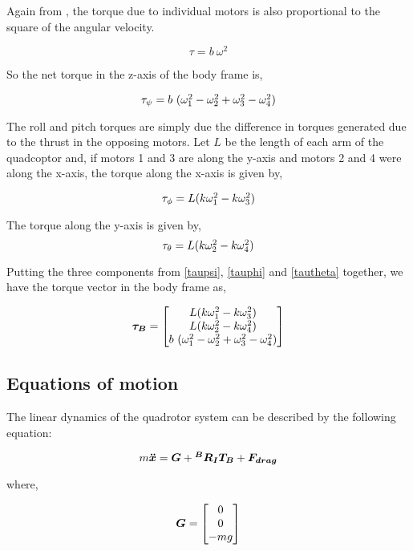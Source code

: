 \documentclass[12pt,fleqn]{article}
\newcommand{\mbm}[1]{\mbox{\boldmath $#1$}}
\begin{document}
Again from \cite{Andrew}, the torque due to individual motors is also
proportional to the square of the angular velocity.

$$ \tau = b\ \omega^2 $$

So the net torque in the z-axis of the body frame is,

\begin{equation} \label{taupsi}
$$ \tau_\psi = b\ (\omega_1^2 - \omega_2^2 + \omega_3^2 -
\omega_4^2) $$
\end{equation}

The roll and pitch torques are simply due the difference in torques
generated due to the thrust in the opposing motors. Let $L$ be the
length of each arm of the quadcoptor and, if motors 1 and 3 are along
the y-axis and motors 2 and 4 were along the x-axis, the torque along
the x-axis is given by,

\begin{equation} \label{tauphi}
$$ \tau_\phi = L (k\omega_1^2 - k\omega_3^2) $$
\end{equation}

The torque along the y-axis is given by,
\begin{equation} \label{tautheta}
$$ \tau_\theta = L (k\omega_2^2 - k\omega_4^2) $$
\end{equation}

Putting the three components from \ref{taupsi}, \ref{tauphi} and
\ref{tautheta} together, we have the torque vector in the body frame as,

\begin{equation} \label{tauvector} 
$$ \mbm{\tau_B} = \begin{bmatrix} L (k\omega_1^2 - k\omega_3^2)\\ L
  (k\omega_2^2 - k\omega_4^2) \\ b\ (\omega_1^2 - \omega_2^2 + \omega_3^2 -
\omega_4^2) \end{bmatrix} $$
\end{equation}

\subsection{Equations of motion}

The linear dynamics of the quadrotor system can be described by the
following equation:

$$ m \mbm{\ddot{x}} = \mbm{G} + \mbm{^BR_IT_{B}} + \mbm{F_{drag}} $$

where, 

$$ \mbm{G} = \begin{bmatrix} 0 \\ 0 \\ -mg \end{bmatrix} $$
\end{document}
